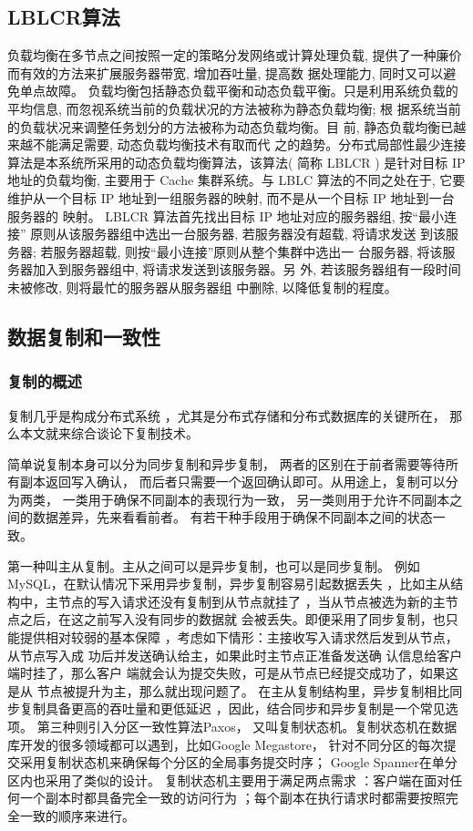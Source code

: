 \subsection{LBLCR算法}
负载均衡在多节点之间按照一定的策略分发网络或计算处理负载,
提供了一种廉价而有效的方法来扩展服务器带宽, 增加吞吐量, 提高数
据处理能力, 同时又可以避免单点故障。
负载均衡包括静态负载平衡和动态负载平衡。只是利用系统负载的
平均信息, 而忽视系统当前的负载状况的方法被称为静态负载均衡; 根
据系统当前的负载状况来调整任务划分的方法被称为动态负载均衡。目
前, 静态负载均衡已越来越不能满足需要, 动态负载均衡技术有取而代
之的趋势。分布式局部性最少连接算法是本系统所采用的动态负载均衡算法，该算法( 简称 LBLCR ) 是针对目标 IP 地址的负载均衡, 主要用于
Cache 集群系统。与 LBLC 算法的不同之处在于, 它要维护从一个目标 IP
地址到一组服务器的映射, 而不是从一个目标 IP 地址到一台服务器的
映射。
LBLCR 算法首先找出目标 IP 地址对应的服务器组, 按“最小连接”
原则从该服务器组中选出一台服务器, 若服务器没有超载, 将请求发送
到该服务器; 若服务器超载, 则按“最小连接”原则从整个集群中选出一
台服务器, 将该服务器加入到服务器组中, 将请求发送到该服务器。另
外, 若该服务器组有一段时间未被修改, 则将最忙的服务器从服务器组
中删除, 以降低复制的程度。
\subsection{数据复制和一致性}
\subsubsection{复制的概述}
复制几乎是构成分布式系统
，尤其是分布式存储和分布式数据库的关键所在，
那么本文就来综合谈论下复制技术。

简单说复制本身可以分为同步复制和异步复制，
两者的区别在于前者需要等待所有副本返回写入确认，
而后者只需要一个返回确认即可。从用途上，复制可以分为两类，
一类用于确保不同副本的表现行为一致，
另一类则用于允许不同副本之间的数据差异，先来看看前者。
有若干种手段用于确保不同副本之间的状态一致。

第一种叫主从复制。主从之间可以是异步复制，也可以是同步复制。
例如MySQL，在默认情况下采用异步复制，异步复制容易引起数据丢失
，比如主从结构中，主节点的写入请求还没有复制到从节点就挂了
，当从节点被选为新的主节点之后，在这之前写入没有同步的数据就
会被丢失。即便采用了同步复制，也只能提供相对较弱的基本保障
，考虑如下情形：主接收写入请求然后发到从节点，从节点写入成
功后并发送确认给主，如果此时主节点正准备发送确
认信息给客户端时挂了，那么客户
端就会认为提交失败，可是从节点已经提交成功了，如果这是从
节点被提升为主，那么就出现问题了。
在主从复制结构里，异步复制相比同步复制具备更高的吞吐量和更低延迟
，因此，结合同步和异步复制是一个常见选项。
第三种则引入分区一致性算法Paxos，
又叫复制状态机。复制状态机在数据
库开发的很多领域都可以遇到，比如Google Megastore，
针对不同分区的每次提交采用复制状态机来确保每个分区的全局事务提交时序；
Google Spanner在单分区内也采用了类似的设计。
复制状态机主要用于满足两点需求
：客户端在面对任何一个副本时都具备完全一致的访问行为
；每个副本在执行请求时都需要按照完全一致的顺序来进行。
